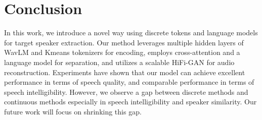 \documentclass[conference]{IEEEtran}
\begin{document}
\section{Conclusion}
In this work, we introduce a novel way using discrete tokens and language models for target speaker extraction.
Our method leverages multiple hidden layers of WavLM and Kmeans tokenizers for encoding, employs cross-attention and a language model for separation, and utilizes a scalable HiFi-GAN for audio reconstruction.
Experiments have 
shown that our model can achieve excellent performance in terms of speech quality, and comparable performance in terms of speech intelligibility. However, we observe a gap between discrete methods and continuous methods especially in speech intelligibility and speaker similarity. Our future work will focus on shrinking 
this gap. 






\end{document}
